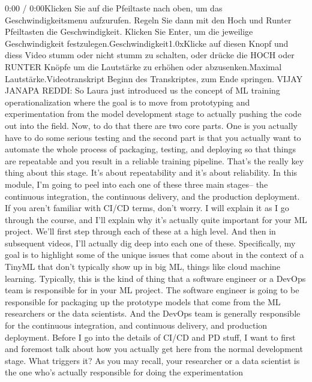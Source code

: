 {{{    0:00 / 0:00Klicken Sie auf die Pfeiltaste nach oben, um das Geschwindigkeitsmenu aufzurufen. Regeln Sie dann mit den Hoch und Runter Pfeiltasten die Geschwindigkeit. Klicken Sie Enter, um die jeweilige Geschwindigkeit festzulegen.Geschwindigkeit1.0xKlicke auf diesen Knopf und diess Video stumm oder nicht stumm zu schalten, oder drücke die HOCH oder RUNTER Knöpfe um die Lautstärke zu erhöhen oder abzusenken.Maximal Lautstärke.Videotranskript
    Beginn des Transkriptes, zum Ende springen.
    VIJAY JANAPA REDDI: So Laura just introduced
    us the concept of ML training operationalization where
    the goal is to move from prototyping and experimentation
    from the model development stage to actually pushing
    the code out into the field.
    Now, to do that there are two core parts.
    One is you actually have to do some serious testing
    and the second part is that you actually want
    to automate the whole process of packaging, testing, and deploying
    so that things are repeatable and you result in a reliable training pipeline.
    That's the really key thing about this stage.
    It's about repeatability and it's about reliability.
    In this module, I'm going to peel into each one of these three main stages--
    the continuous integration, the continuous delivery,
    and the production deployment.
    If you aren't familiar with CI/CD terms, don't worry.
    I will explain it as I go through the course,
    and I'll explain why it's actually quite important for your ML project.
    We'll first step through each of these at a high level.
    And then in subsequent videos, I'll actually
    dig deep into each one of these.
    Specifically, my goal is to highlight some of the unique issues that
    come about in the context of a TinyML that don't typically show up in big ML,
    things like cloud machine learning.
    Typically, this is the kind of thing that a software engineer or a DevOps
    team is responsible for in your ML project.
    The software engineer is going to be responsible for packaging up
    the prototype models that come from the ML researchers or the data scientists.
    And the DevOps team is generally responsible
    for the continuous integration, and continuous delivery,
    and production deployment.
    Before I go into the details of CI/CD and PD stuff,
    I want to first and foremost talk about how you actually get here
    from the normal development stage.
    What triggers it?
    As you may recall, your researcher or a data scientist
    is the one who's actually responsible for doing the experimentation
}}}
